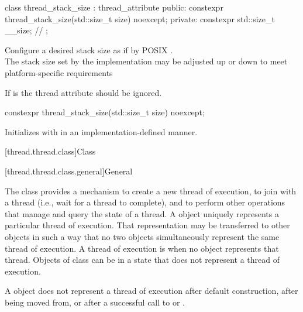 \documentclass{wg21}
\begin{document}
\begin{addedblock}
\begin{codeblock}
class thread_stack_size : thread_attribute {
public:
    constexpr thread_stack_size(std::size_t size) noexcept;
private:
    constexpr std::size_t __size; // \expos
};
\end{codeblock}

\recommended
Configure a desired stack size as if by POSIX \mbox{}.\\
The stack size set by the implementation may be adjusted up or down to meet platform-specific requirements

If  is  the thread attribute should be ignored.


\begin{itemdecl}
constexpr thread_stack_size(std::size_t size) noexcept;
\end{itemdecl}

\begin{itemdescr}
\effects Initializes  with  in an implementation-defined manner.
\end{itemdescr}

\end{addedblock}

[thread.thread.class]{Class }

[thread.thread.class.general]{General}

\pnum
The class  provides a mechanism to create a new thread of execution, to join with
a thread (i.e., wait for a thread to complete), and to perform other operations that manage and
query the state of a thread. A  object uniquely represents a particular thread of
execution. That representation may be transferred to other  objects in such a way
that no two  objects simultaneously represent the same thread of execution. A
thread of execution is  when no  object represents that thread.
Objects of class  can be in a state that does not represent a thread of
execution.
\begin{note}
    A  object does not represent a thread of execution after
    default construction, after being moved from, or after a successful call to  or
    .
\end{note}
\end{document}
